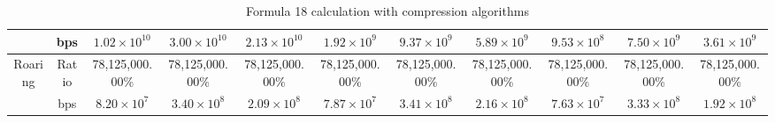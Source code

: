 \begin{table}[h]
{\begin{tabular}{|c|c|c|c|c|c|c|c|c|c|c|}
\cline{2-11}
& bps & $1.02 \times 10^{10}$ & $3.00 \times 10^{10}$ & $2.13 \times 10^{10}$ & $1.92 \times 10^{9}$ & $9.37 \times 10^{9}$ & $5.89 \times 10^{9}$ & $9.53 \times 10^{8}$ & $7.50 \times 10^{9}$ & $3.61 \times 10^{9}$ \\
\hline
\multirow{2}{*}{Roaring} & Ratio & 78,125,000.00\% & 78,125,000.00\% & 78,125,000.00\% & 78,125,000.00\% & 78,125,000.00\% & 78,125,000.00\% & 78,125,000.00\% & 78,125,000.00\% & 78,125,000.00\% \\
\cline{2-11}
& bps & $8.20 \times 10^{7}$ & $3.40 \times 10^{8}$ & $2.09 \times 10^{8}$ & $7.87 \times 10^{7}$ & $3.41 \times 10^{8}$ & $2.16 \times 10^{8}$ & $7.63 \times 10^{7}$ & $3.33 \times 10^{8}$ & $1.92 \times 10^{8}$ \\
\hline
\end{tabular}
}
\caption{Formula 18 calculation with compression algorithms}
\label{tbl:formulacompress18}
\end{table}


